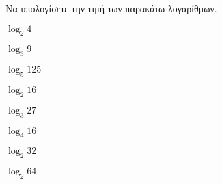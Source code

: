 Να υπολογίσετε την τιμή των παρακάτω λογαρίθμων.
\begin{multicols}{4}
\begin{rlist}[leftmargin=2mm]
\item $ \log_{2}{4} $
\item $ \log_{3}{9} $
\item $ \log_{5}{125} $
\item $ \log_{2}{16} $
\item $ \log_{3}{27} $
\item $ \log_{4}{16} $
\item $ \log_{2}{32} $
\item $ \log_{2}{64} $
\end{rlist}
\end{multicols}
